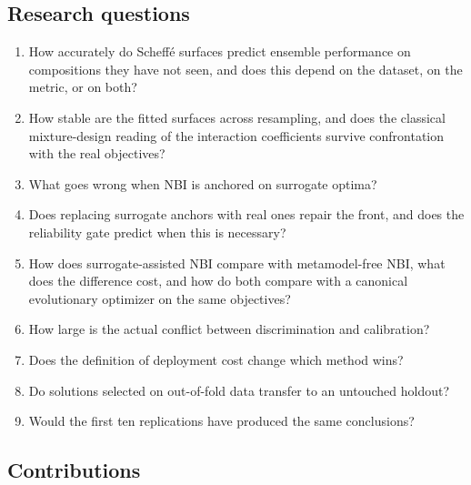 \subsection{Research questions}

\begin{enumerate}
\item[\textbf{RQ1}] How accurately do Scheffé surfaces predict ensemble performance on compositions they have not
seen, and does this depend on the dataset, on the metric, or on both?
\item[\textbf{RQ2}] How stable are the fitted surfaces across resampling, and does the classical mixture-design
reading of the interaction coefficients survive confrontation with the real objectives?
\item[\textbf{RQ3}] What goes wrong when NBI is anchored on surrogate optima?
\item[\textbf{RQ4}] Does replacing surrogate anchors with real ones repair the front, and does the reliability gate
predict when this is necessary?
\item[\textbf{RQ5}] How does surrogate-assisted NBI compare with metamodel-free NBI, what does the difference cost,
and how do both compare with a canonical evolutionary optimizer on the same objectives?
\item[\textbf{RQ6}] How large is the actual conflict between discrimination and calibration?
\item[\textbf{RQ7}] Does the definition of deployment cost change which method wins?
\item[\textbf{RQ8}] Do solutions selected on out-of-fold data transfer to an untouched holdout?
\item[\textbf{RQ9}] Would the first ten replications have produced the same conclusions?
\end{enumerate}

\subsection{Contributions}

